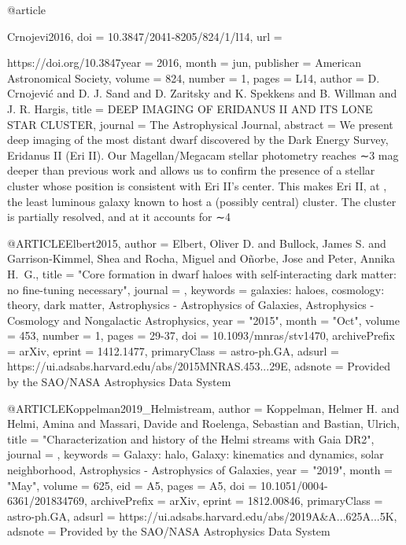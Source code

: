 \documentclass[apj]{emulateapj}
\begin{document}
{{@article{Crnojevi2016,
	doi = {10.3847/2041-8205/824/1/l14},
	url = {https://doi.org/10.3847year = 2016,
	month = {jun},
	publisher = {American Astronomical Society},
	volume = {824},
	number = {1},
	pages = {L14},
	author = {D. Crnojevi{\'{c}} and D. J. Sand and D. Zaritsky and K. Spekkens and B. Willman and J. R. Hargis},
	title = {{DEEP} {IMAGING} {OF} {ERIDANUS} {II} {AND} {ITS} {LONE} {STAR} {CLUSTER}},
	journal = {The Astrophysical Journal},
	abstract = {We present deep imaging of the most distant dwarf discovered by the Dark Energy Survey, Eridanus II (Eri II). Our Magellan/Megacam stellar photometry reaches ∼3 mag deeper than previous work and allows us to confirm the presence of a stellar cluster whose position is consistent with Eri II’s center. This makes Eri II, at , the least luminous galaxy known to host a (possibly central) cluster. The cluster is partially resolved, and at  it accounts for ∼4}



@ARTICLE{Elbert2015,
       author = {{Elbert}, Oliver D. and {Bullock}, James S. and {Garrison-Kimmel}, Shea and
         {Rocha}, Miguel and {O{\~n}orbe}, Jose and {Peter}, Annika H.~G.},
        title = "{Core formation in dwarf haloes with self-interacting dark matter: no fine-tuning necessary}",
      journal = {\mnras},
     keywords = {galaxies: haloes, cosmology: theory, dark matter, Astrophysics - Astrophysics of Galaxies, Astrophysics - Cosmology and Nongalactic Astrophysics},
         year = "2015",
        month = "Oct",
       volume = {453},
       number = {1},
        pages = {29-37},
          doi = {10.1093/mnras/stv1470},
archivePrefix = {arXiv},
       eprint = {1412.1477},
 primaryClass = {astro-ph.GA},
       adsurl = {https://ui.adsabs.harvard.edu/abs/2015MNRAS.453...29E},
      adsnote = {Provided by the SAO/NASA Astrophysics Data System}
}

@ARTICLE{Koppelman2019_Helmistream,
       author = {{Koppelman}, Helmer H. and {Helmi}, Amina and {Massari}, Davide and
         {Roelenga}, Sebastian and {Bastian}, Ulrich},
        title = "{Characterization and history of the Helmi streams with Gaia DR2}",
      journal = {\aap},
     keywords = {Galaxy: halo, Galaxy: kinematics and dynamics, solar neighborhood, Astrophysics - Astrophysics of Galaxies},
         year = "2019",
        month = "May",
       volume = {625},
          eid = {A5},
        pages = {A5},
          doi = {10.1051/0004-6361/201834769},
archivePrefix = {arXiv},
       eprint = {1812.00846},
 primaryClass = {astro-ph.GA},
       adsurl = {https://ui.adsabs.harvard.edu/abs/2019A&A...625A...5K},
      adsnote = {Provided by the SAO/NASA Astrophysics Data System}
}




}}}}
\end{document}
